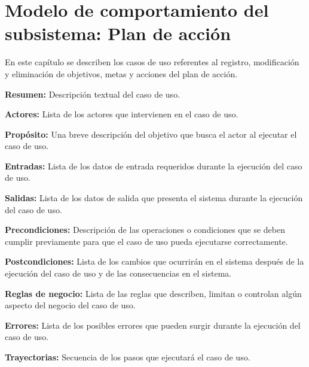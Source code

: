 \documentclass[10pt]{book}
\begin{document}

\chapter{Modelo de comportamiento del subsistema: Plan de acción} \label{chp:modeloComportamientoInformacionBase}
     
     En este capítulo se describen los casos de uso referentes al registro, modificación y eliminación de objetivos, metas y acciones del plan de acción. \bigskip

     \begin{objetivos}
	\item {\bf Resumen:} Descripción textual del caso de uso.
	\item {\bf Actores:} Lista de los actores que intervienen en el caso de uso.
	\item {\bf Propósito:} Una breve descripción del objetivo que busca el actor al ejecutar el caso de uso.
	\item {\bf Entradas:} Lista de los datos de entrada requeridos durante la ejecución del caso de uso.
	\item {\bf Salidas:} Lista de los datos de salida que presenta el sistema durante la ejecución del caso de uso.
	\item {\bf Precondiciones:} Descripción de las operaciones o condiciones que se deben cumplir previamente para que el caso de uso pueda ejecutarse correctamente.
	\item {\bf Postcondiciones:} Lista de los cambios que ocurrirán en el sistema después de la ejecución del caso de uso y de las consecuencias en el sistema.
	\item {\bf Reglas de negocio:} Lista de las reglas que describen, limitan o controlan algún aspecto del negocio del caso de uso.
	\item {\bf Errores:} Lista de los posibles errores que pueden surgir durante la ejecución del caso de uso.
	\item {\bf Trayectorias:} Secuencia de los pasos que ejecutará el caso de uso.
    \end{objetivos}
\end{document}
